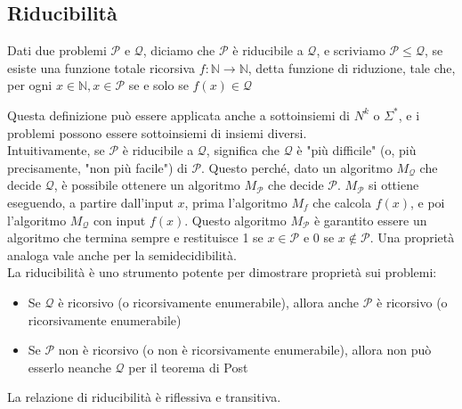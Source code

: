 \documentclass[12pt, a4paper]{report}
\begin{document}
                    \subsection{Riducibilità}
                        \begin{definitionbox}{}{}
                            Dati due problemi $\mathcal{P}$ e $\mathcal{Q}$, diciamo che $\mathcal{P}$ è riducibile a $\mathcal{Q}$, e scriviamo $\mathcal{P}\leq \mathcal{Q}$, se esiste una funzione totale ricorsiva $f:\mathbb{N}\to\mathbb{N}$, detta funzione di riduzione, tale che, per ogni $x\in\mathbb{N},x\in\mathcal{P}$ se e solo se $f(x)\in\mathcal{Q}$
                        \end{definitionbox}
                        Questa definizione può essere applicata anche a sottoinsiemi di $N^k$ o $\Sigma^*$, e i problemi possono essere sottoinsiemi di insiemi diversi.\\
                        Intuitivamente, se $\mathcal{P}$ è riducibile a $\mathcal{Q}$, significa che $\mathcal{Q}$ è "più difficile" (o, più precisamente, "non più facile") di $\mathcal{P}$. Questo perché, dato un algoritmo $M_\mathcal{Q}$ che decide $\mathcal{Q}$, è possibile ottenere un algoritmo $M_\mathcal{P}$ che decide $\mathcal{P}$. $M_\mathcal{P}$ si ottiene eseguendo, a partire dall'input $x$, prima l'algoritmo $M_f$ che calcola $f(x)$, e poi l'algoritmo $M_\mathcal{Q}$ con input $f(x)$. Questo algoritmo $M_\mathcal{P}$ è garantito essere un algoritmo che termina sempre e restituisce 1 se $x \in \mathcal{P}$ e 0 se $x \notin \mathcal{P}$. Una proprietà analoga vale anche per la semidecidibilità.\\
                        La riducibilità è uno strumento potente per dimostrare proprietà sui problemi: \begin{itemize}
                            \item Se $\mathcal{Q}$ è ricorsivo (o ricorsivamente enumerabile), allora anche $\mathcal{P}$ è ricorsivo (o ricorsivamente enumerabile)
                            \item Se $\mathcal{P}$ non è ricorsivo (o non è ricorsivamente enumerabile), allora non può esserlo neanche $\mathcal{Q}$ per il teorema di Post
                        \end{itemize}
                        La relazione di riducibilità è riflessiva e transitiva.
\end{document}
